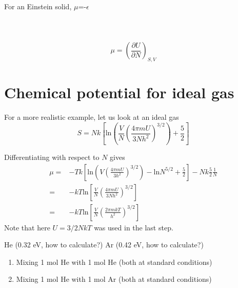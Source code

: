 \begin{figure}[h]
\centering
{}
\end{figure}

For an Einstein solid, $\mu$=-$\epsilon$\\\\\\\
\begin{equation} \mu = (\frac{\partial U}{\partial N})_{S,V}  \end{equation}


\section{Chemical potential for ideal gas}

For a more realistic example, let us look at an ideal gas 
\begin{equation} \label{entropy} 
S = Nk[\text{ln}(\frac{V}{N} (\frac{4\pi m U}{3Nh^2})^{3/2}) + \frac{5}{2}]
\end{equation}

Differentiating with respect to $N$ gives
\begin{equation}
\begin{split}
\mu =& -T{ k[\text{ln} (V (\frac{4\pi mU}{3h^2})^{3/2} )  - \text{ln}N^{5/2} + \frac{5}{2} ] - Nk\frac{5}{2}\frac{1}{N} }\\
    =& -kT\text{ln}[\frac{V}{N} (\frac{4{\pi} mU}  {3Nh^2})^{3/2} ]\\
    =& -kT\text{ln}[\frac{V}{N} (\frac{2{\pi} mkT} {h^2})^{3/2} ]
\end{split}
\end{equation}
Note that here $U = 3/2NkT$ was used in the last step.

He (0.32 eV, how to calculate?)
Ar (0.42 eV, how to calculate?)


\begin{enumerate}
\item Mixing 1 mol He with 1 mol He (both at standard conditions)
\item Mixing 1 mol He with 1 mol Ar (both at standard conditions)
\end{enumerate}


